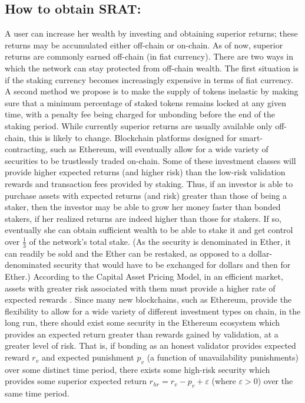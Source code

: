 \documentclass{article}
\renewcommand{\|}{\;|\;}
\begin{document}
\subsection{How to obtain SRAT:}
A user can increase her wealth by investing and obtaining superior returns; these returns may be  accumulated either off-chain or on-chain. As of now, superior returns are commonly earned off-chain (in fiat currency). There are two ways in which the network can stay protected from off-chain wealth. The first situation is if the staking currency becomes increasingly expensive in terms of fiat currency. A second method we propose is to make the supply of tokens inelastic by making sure that a minimum percentage of staked tokens remains locked at any given time, with a penalty fee being charged for unbonding before the end of the staking period.\newline \newline
While currently superior returns are usually available only off-chain, this is likely to change. Blockchain platforms designed for smart-contracting, such as Ethereum, will eventually allow for a wide variety of securities to be trustlessly traded on-chain. Some of these investment classes will provide higher expected returns (and higher risk) than the low-risk validation rewards and transaction fees provided by staking. Thus, if an investor is able to purchase assets with expected returns (and risk) greater than those of being a staker, then the investor may be able to grow her money faster than bonded stakers, if her realized returns are indeed higher than those for stakers. If so, eventually she can obtain sufficient wealth to be able to stake it and get control over $\frac{1}{3}$ of the network's total stake. (As the security is denominated in Ether, it can readily be sold and the Ether can be restaked, as opposed to a dollar-denominated security that would have to be exchanged for dollars and then for Ether.) \newline \newline
According to the Capital Asset Pricing Model, in an efficient market, assets with greater risk associated with them must provide a higher rate of expected rewards \cite{sharpe1964}. Since many new blockchains, such as Ethereum, provide the flexibility to allow for a wide variety of different investment types on chain, in the long run, there should exist some security in the Ethereum ecosystem which provides an expected return greater than rewards gained by validation, at a greater level of risk. That is, if bonding as an honest validator provides expected reward $r_{v}$ and expected punishment $p_{v}$ (a function of unavailability punishments) over some distinct time period, there exists some high-risk security which provides some superior expected return $r_{hr} = r_{v} - p_{v} + \varepsilon$ (where $\varepsilon > 0$) over the same time period.\newline \newline
\end{document}
